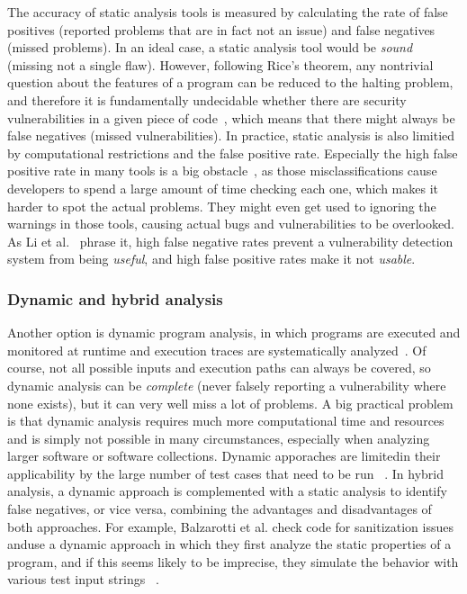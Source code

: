 \documentclass[
a4paper,
pagesize,
pdftex,
12pt,
twoside, %
BCOR=5mm, %
ngerman,
fleqn,
final,
]{scrartcl}
\begin{document}
	The accuracy of static analysis tools is measured by calculating the rate of false positives (reported problems that are in fact not an issue) and false negatives (missed problems). In an ideal case, a static analysis tool would be \textit{sound} (missing not a single flaw). However, following Rice's theorem, any nontrivial question about the features of a program can be reduced to the halting problem, and therefore it is fundamentally undecidable whether there are security vulnerabilities in a given piece of code~\cite{Chess.2004}, which means that there might always be false negatives (missed vulnerabilities). In practice, static analysis is also limitied by computational restrictions and the false positive rate. Especially the high false positive rate in many tools is a big obstacle~\cite{Liu.2018}, as those misclassifications cause developers to spend a large amount of time checking each one, which makes it harder to spot the actual problems. They might even get used to ignoring the warnings in those tools, causing actual bugs and vulnerabilities to be overlooked. As Li et al.~\cite{Li.2005} phrase it, high false negative rates prevent a vulnerability detection system from being \textit{useful}, and high false positive rates make it not \textit{usable}.\\
	
	\subsubsection{Dynamic and hybrid analysis}
	Another option is dynamic program analysis, in which programs are executed and monitored at runtime and execution traces are systematically analyzed~\cite{Shar.2013c}. Of course, not all possible inputs and execution paths can always be covered, so dynamic analysis can be \textit{complete} (never falsely reporting a vulnerability where none exists), but it can very well miss a lot of problems. A big practical problem is that dynamic analysis requires much more computational time and resources and is simply not possible in many circumstances, especially when analyzing larger software or software collections. Dynamic apporaches are limitedin their applicability by the large number of test cases that need to be run ~\cite{Aggarwal.2006}.
	In hybrid analysis, a dynamic approach is complemented with a static analysis to identify false negatives, or vice versa, combining the advantages and disadvantages of both approaches. For example, Balzarotti et al. check code for sanitization issues anduse a dynamic approach in which they first analyze the static properties of a program, and if this seems likely to be imprecise, they simulate the behavior with various test input strings ~\cite{Balzarotti.2008}. 
	
\end{document}
